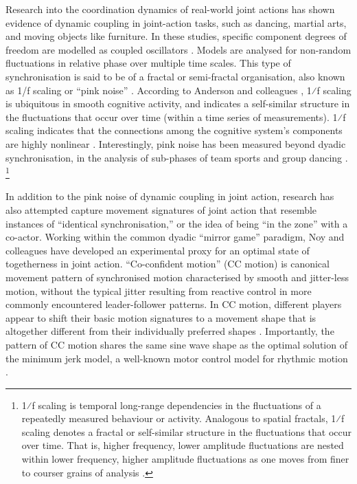 
Research into the coordination dynamics of real-world joint actions  has shown evidence of dynamic coupling in joint-action tasks, such as dancing, martial arts, and moving objects like furniture.  In these studies, specific component degrees of freedom are modelled as coupled oscillators \citep[using the HKB model, which describes the change in the relative phase between two oscillatory components.   See][]{Haken1985,Kelso1986}.  Models are analysed for non-random fluctuations in relative phase over multiple time scales.  This type of synchronisation is said to be of a fractal or semi-fractal organisation, also known as 1/f scaling or ``pink noise'' \citep{Caron2017}.  According to Anderson and colleagues \citep{Anderson2012}, 1⁄f scaling is ubiquitous in smooth cognitive activity, and indicates a self-similar structure in the fluctuations that occur over time (within a time series of measurements).
1⁄f scaling indicates that the connections among the cognitive system's components are highly nonlinear \citep{Ding2002,Holden2013,Kello2010,Riley2011,VanOrden2003,VanOrden2005}. Interestingly, pink noise has been measured beyond dyadic synchronisation, in the analysis of sub-phases of team sports \citep{Passos2014,Duarte2012} and group dancing \citep{Chauvigne2017}.
  \footnote{1⁄f scaling is temporal long-range dependencies in the fluctuations of a repeatedly measured behaviour or activity. Analogous to spatial fractals, 1⁄f scaling denotes a fractal or self-similar structure in the fluctuations that occur over time. That is, higher frequency, lower amplitude fluctuations are nested within lower frequency, higher amplitude fluctuations as one moves from finer to courser grains of analysis \cites(for a more detailed description see, for example)(){Holden2005}{Kello2009}.}

In addition to the pink noise of dynamic coupling in joint action, research has also attempted capture movement signatures of joint action that resemble instances of ``identical synchronisation,'' or the idea of being ``in the zone'' with a co-actor.  Working within the common dyadic ``mirror game'' paradigm, Noy and colleagues \textcite{Noy2011,Noy2015,Hart2014} have developed an experimental proxy for an optimal state of togetherness in joint action.  ``Co-confident motion'' (CC motion) is canonical movement pattern of synchronised motion characterised by smooth and jitter-less motion, without the typical jitter resulting from reactive control in more commonly encountered leader-follower patterns.  In CC motion, different players appear to shift their basic motion signatures to a movement shape that is altogether different from their individually preferred shapes \citep{Hart2014}. Importantly, the pattern of CC motion shares the same sine wave shape as the optimal solution of the minimum jerk model, a well-known motor control model for rhythmic motion \citep{Hogan2007}.

